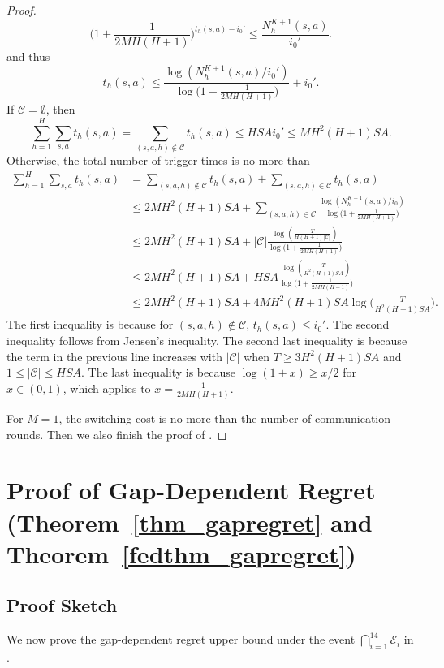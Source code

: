 \documentclass{article}
\begin{document}
\begin{proof}
\begin{equation*}
\Big(1+\frac{1}{2MH(H+1)}\Big)^{t_h(s,a)-i_0' } \leq \frac{N_h^{K+1}(s,a)}{i_0' }.
\end{equation*}
and thus 
$$t_h(s,a) \leq \frac{\log(N_h^{K+1}(s,a)/i_0')}{\log\big(1+\frac{1}{2MH(H+1)}\big)} +i_0' .$$
If $\mathcal{C} = \emptyset$, then 
$$\sum_{h=1}^H\sum_{s,a}t_h(s,a) = \sum_{(s,a,h) \notin \mathcal{C}} t_h(s,a) \leq HSAi_0'  \leq MH^2(H+1)SA.$$
Otherwise, the total number of trigger times is no more than
\begin{align*}
    \sum_{h=1}^H\sum_{s,a}t_h(s,a) &= \sum_{(s,a,h) \notin \mathcal{C}} t_h(s,a)+ \sum_{(s,a,h) \in \mathcal{C}} t_h(s,a)\nonumber\\
    &\leq 2MH^2(H+1)SA+ \sum_{(s,a,h) \in \mathcal{C}}\frac{\log(N_h^{K+1}(s,a)/i_0)}{\log\big(1+\frac{1}{2MH(H+1)}\big)} \nonumber\\
    &\leq 2MH^2(H+1)SA+|\mathcal{C}|\frac{\log(\frac{T}{H(H+1)|\mathcal{C}|})}{\log\big(1+\frac{1}{2MH(H+1)}\big)} \nonumber\\
    &\leq 2MH^2(H+1)SA+ HSA\frac{\log\left(\frac{T}{H^2(H+1)SA}\right)}{\log\big(1+\frac{1}{2MH(H+1)}\big)} \nonumber\\
    &\leq 2MH^2(H+1)SA+ 4MH^2(H+1)SA\log\Big(\frac{T}{H^2(H+1)SA}\Big).
\end{align*}
The first inequality is because for $(s,a,h) \notin \mathcal{C}$, $t_h(s,a) \leq i_0' $. The second inequality follows from Jensen's inequality. The second last inequality is because the term in the previous line increases with $|\mathcal{C}| $ when $T \geq 3H^2(H+1)SA$ and $1 \leq |\mathcal{C}| \leq HSA$. The last inequality is because $\log(1+x) \geq x/2$ for $x \in (0,1)$, which applies to $x = \frac{1}{2MH(H+1)}$. 

For $M=1$, the switching cost is no more than the number of communication rounds. Then we also finish the proof of .
\end{proof}

\section{Proof of Gap-Dependent Regret \texorpdfstring{(Theorem~\ref{thm_gapregret} and Theorem~\ref{fedthm_gapregret})}{(Theorem 4.5 and Theorem 4.7)}}
\label{gapregret}
\subsection{Proof Sketch}
We now prove the gap-dependent regret upper bound under the event $\bigcap_{i=1}^{14}\mathcal{E}_i$ in .
\end{document}
